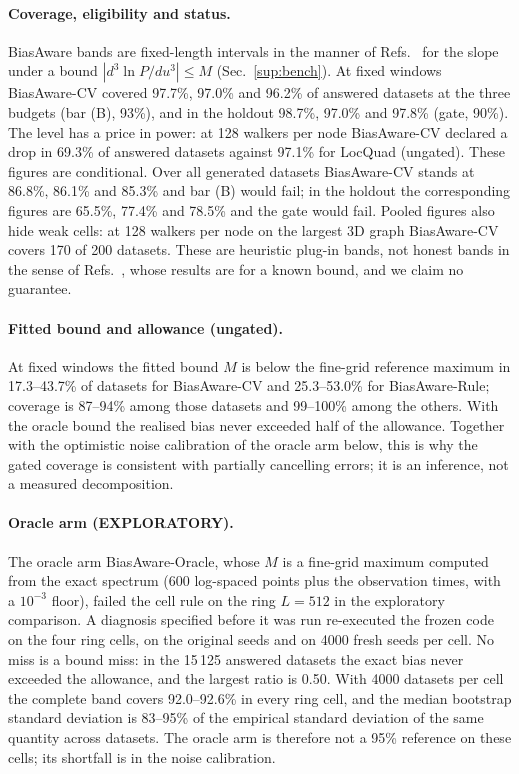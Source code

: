 \documentclass[aps,pre,twocolumn,superscriptaddress,nofootinbib,10pt]{revtex4-2}
\newcommand{\nm}[1]{\textsf{#1}}
\newcommand{\LQ}{\nm{LocQuad}}
\newcommand{\BAC}{\nm{BiasAware-CV}}
\newcommand{\BAR}{\nm{BiasAware-Rule}}
\newcommand{\BA}{\nm{BiasAware}}
\begin{document}
\paragraph*{Coverage, eligibility and status.}
\BA{} bands are fixed-length intervals in the manner of Refs.~\cite{ak2018,ak2020} for the slope under a bound $|d^3\ln P/du^3|\le M$ (Sec.~\ref{sup:bench}). At fixed windows \BAC{} covered 97.7\%, 97.0\% and 96.2\% of answered datasets at the three budgets (bar (B), 93\%), and in the holdout 98.7\%, 97.0\% and 97.8\% (gate, 90\%). The level has a price in power: at 128 walkers per node \BAC{} declared a drop in 69.3\% of answered datasets against 97.1\% for \LQ{} (ungated). These figures are conditional. Over all generated datasets \BAC{} stands at 86.8\%, 86.1\% and 85.3\% and bar (B) would fail; in the holdout the corresponding figures are 65.5\%, 77.4\% and 78.5\% and the gate would fail. Pooled figures also hide weak cells: at 128 walkers per node on the largest 3D graph \BAC{} covers 170 of 200 datasets. These are heuristic plug-in bands, not honest bands in the sense of Refs.~\cite{ak2018,ak2020}, whose results are for a known bound, and we claim no guarantee.

\paragraph*{Fitted bound and allowance (ungated).}
At fixed windows the fitted bound $M$ is below the fine-grid reference maximum in 17.3--43.7\% of datasets for \BAC{} and 25.3--53.0\% for \BAR{}; coverage is 87--94\% among those datasets and 99--100\% among the others. With the oracle bound the realised bias never exceeded half of the allowance. Together with the optimistic noise calibration of the oracle arm below, this is why the gated coverage is consistent with partially cancelling errors; it is an inference, not a measured decomposition.

\paragraph*{Oracle arm (EXPLORATORY).}
The oracle arm \textsf{BiasAware-Oracle}, whose $M$ is a fine-grid maximum computed from the exact spectrum (600 log-spaced points plus the observation times, with a $10^{-3}$ floor), failed the cell rule on the ring $L=512$ in the exploratory comparison. A diagnosis specified before it was run re-executed the frozen code on the four ring cells, on the original seeds and on 4000 fresh seeds per cell. No miss is a bound miss: in the 15\,125 answered datasets the exact bias never exceeded the allowance, and the largest ratio is 0.50. With 4000 datasets per cell the complete band covers 92.0--92.6\% in every ring cell, and the median bootstrap standard deviation is 83--95\% of the empirical standard deviation of the same quantity across datasets. The oracle arm is therefore not a 95\% reference on these cells; its shortfall is in the noise calibration.
\end{document}
